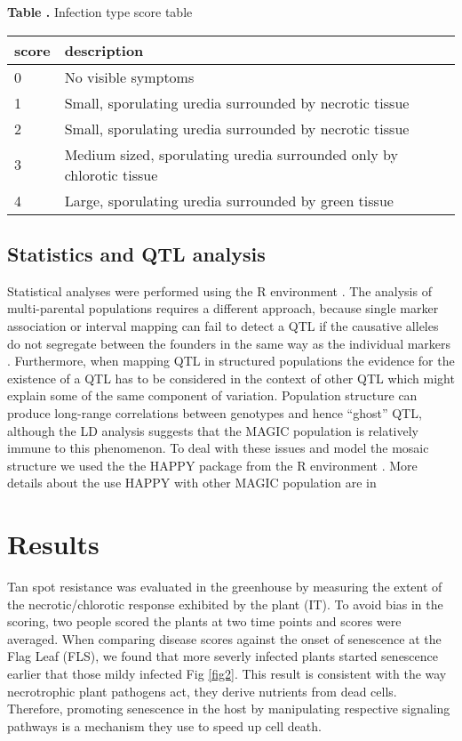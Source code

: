 \documentclass{frontiersSCNS} %
\begin{document}
\begin{table}[!t]
\textbf{\label{Tab:02} Table .}{ Infection type score table}\\
\processtable{}
{\begin{tabular}{l|l}
\hline
	score & description \\\midrule
	0 & No visible symptoms \\
	1  & Small, sporulating uredia surrounded by necrotic tissue \\
	2 & Small, sporulating uredia surrounded by necrotic tissue \\
	3 & Medium sized, sporulating uredia surrounded only by chlorotic tissue \\
	4 & Large, sporulating uredia surrounded by green tissue \\ \hline
\end{tabular}}{}
\end{table}


\subsection{Statistics and QTL analysis}
Statistical analyses were performed using the R environment \cite{RManual}. The analysis of multi-parental populations requires a different approach, because single marker association or interval mapping can fail to detect a QTL if the causative alleles do not segregate between the founders in the same way as the individual markers \cite{Mott07112000}. Furthermore, when mapping QTL in structured populations the evidence for the existence of a QTL has to be considered in the context of other QTL which might explain some of the same component of variation. Population structure can produce long-range correlations between genotypes and hence “ghost” QTL, although the LD analysis suggests that the MAGIC population is relatively immune to this phenomenon. To deal with these issues and model the mosaic structure we used the the HAPPY package from the R environment \cite{Mott07112000}. More details about the use HAPPY with other MAGIC population are in \cite{10.1371/journal.pgen.1000551}

\section{Results}
Tan spot resistance was evaluated in the greenhouse by measuring the extent of the necrotic/chlorotic response exhibited by the plant (IT). To avoid bias in the scoring, two people scored the plants at two time points and scores were averaged. When comparing disease scores against the onset of senescence at the Flag Leaf (FLS), we found that more severly infected plants started senescence earlier that those mildy infected Fig \ref{fig2}. This result is consistent with the way necrotrophic plant pathogens act, they derive nutrients from dead cells. Therefore, promoting senescence in the host by manipulating respective signaling pathways is a mechanism they use to speed up cell death.  
\end{document}
